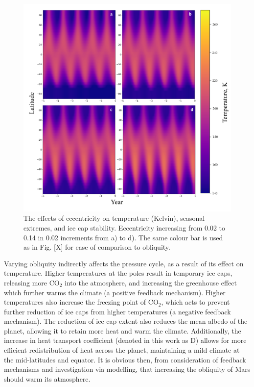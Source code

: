 \documentclass[12pt,onecolumn]{revtex4-2}    %
\begin{document}
\begin{figure}[H]
\centering
\includegraphics[width = 17cm]{eccentricity_heatmaps_new.png}
\caption{The effects of eccentricity on temperature (Kelvin), seasonal extremes, and ice cap stability. Eccentricity increasing from 0.02 to 0.14 in 0.02 increments from a) to d). The same colour bar is used as in Fig. [X] for ease of comparison to obliquity.}
\label{fig:test}
\end{figure}

Varying obliquity indirectly affects the pressure cycle, as a result of its effect on temperature. Higher temperatures at the poles result in temporary ice caps, releasing more $\mathrm{CO_2}$ into the atmosphere, and increasing the greenhouse effect which further warms the climate (a positive feedback mechanism). Higher temperatures also increase the freezing point of $\mathrm{CO_2}$, which acts to prevent further reduction of ice caps from higher temperatures (a negative feedback mechanism). The reduction of ice cap extent also reduces the mean albedo of the planet, allowing it to retain more heat and warm the climate. Additionally, the increase in heat transport coefficient (denoted in this work as D) allows for more efficient redistribution of heat across the planet, maintaining a mild climate at the mid-latitudes and equator. It is obvious then, from consideration of feedback mechanisms and investigation via modelling, that increasing the obliquity of Mars should warm its atmosphere.
\end{document}
